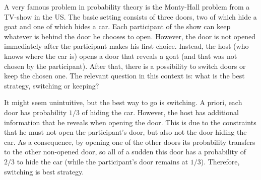 \begin{ex}
A very famous problem in probability theory is the Monty-Hall problem from a TV-show in the US. The basic setting consists of three doors, two of which hide a goat and one of which hides a car. Each participant of the show can keep whatever is behind the door he chooses to open. However, the door is not opened immediately after the participant makes his first choice. Instead, the host (who knows where the car is) opens a door that reveals a goat (and that was not chosen by the participant). After that, there is a possibility to switch doors or keep the chosen one. The relevant question in this context is: what is the best strategy, switching or keeping?


It might seem unintuitive, but the best way to go is switching. A priori, each door has probability $1 / 3$ of hiding the car. However, the host has additional information that he reveals when opening the door. This is due to the constraints that he must not open the participant's door, but also not the door hiding the car. As a consequence, by opening one of the other doors its probability transfers to the other non-opened door, so all of a sudden this door has a probability of $2 / 3$ to hide the car (while the participant's door remains at $1 / 3$). Therefore, switching is best strategy.


\end{ex}
